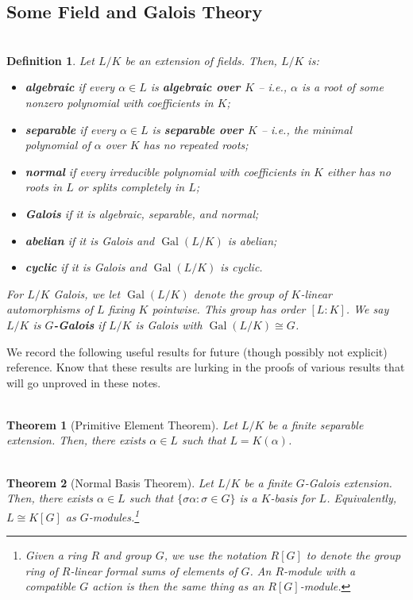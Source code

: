 \documentclass[11pt]{article}
\newcommand{\iso}{\cong}
\DeclareMathOperator{\Gal}{Gal}
\newtheorem*{definition*}{\\Definition}
\newtheorem*{theorem*}{\\Theorem}
\begin{document}
\subsection{Some Field and Galois Theory}
\begin{definition*}
Let $L/K$ be an extension of fields. Then, $L/K$ is:
\begin{itemize}
\item \textbf{algebraic} if every $\alpha\in L$ is \textbf{algebraic over $K$} -- i.e., $\alpha$ is a root of some nonzero polynomial with coefficients in $K$;
\item \textbf{separable} if every $\alpha\in L$ is \textbf{separable over $K$} -- i.e., the minimal polynomial of $\alpha$ over $K$ has no repeated roots;
\item \textbf{normal} if every irreducible polynomial with coefficients in $K$ either has no roots in $L$ or splits completely in $L$;
\item \textbf{Galois} if it is algebraic, separable, and normal;
\item \textbf{abelian} if it is Galois and $\Gal(L/K)$ is abelian;
\item \textbf{cyclic} if it is Galois and $\Gal(L/K)$ is cyclic.
\end{itemize}
For $L/K$ Galois, we let $\Gal(L/K)$ denote the group of $K$-linear automorphisms of $L$ fixing $K$ pointwise. This group has order $[L:K]$. We say $L/K$ is \textbf{$G$-Galois} if $L/K$ is Galois with $\Gal(L/K)\iso G$.
\end{definition*}

We record the following useful results for future (though possibly not explicit) reference. Know that these results are lurking in the proofs of various results that will go unproved in these notes.

\begin{theorem*}[Primitive Element Theorem]
Let $L/K$ be a finite separable extension. Then, there exists $\alpha\in L$ such that $L=K(\alpha)$.
\end{theorem*}

\begin{theorem*}[Normal Basis Theorem]
Let $L/K$ be a finite $G$-Galois extension. Then, there exists $\alpha\in L$ such that $\{\sigma\alpha : \sigma\in G\}$ is a $K$-basis for $L$. Equivalently, $L\iso K[G]$ as $G$-modules.\footnote{Given a ring $R$ and group $G$, we use the notation $R[G]$ to denote the group ring of $R$-linear formal sums of elements of $G$. An $R$-module with a compatible $G$ action is then the same thing as an $R[G]$-module.}
\end{theorem*}
\end{document}
